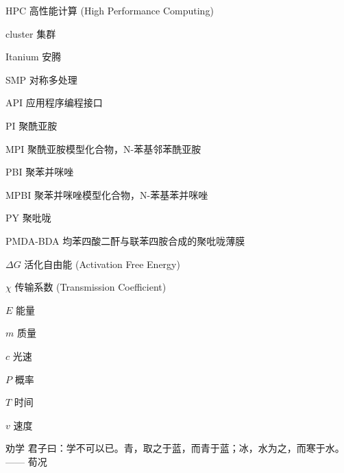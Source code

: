 \begin{denotation}[3cm]
\item[HPC] 高性能计算 (High Performance Computing)
\item[cluster] 集群
\item[Itanium] 安腾
\item[SMP] 对称多处理
\item[API] 应用程序编程接口
\item[PI] 聚酰亚胺
\item[MPI] 聚酰亚胺模型化合物，N-苯基邻苯酰亚胺
\item[PBI] 聚苯并咪唑
\item[MPBI] 聚苯并咪唑模型化合物，N-苯基苯并咪唑
\item[PY] 聚吡咙
\item[PMDA-BDA]	均苯四酸二酐与联苯四胺合成的聚吡咙薄膜
\item[$\Delta G$] 活化自由能 (Activation Free Energy)
\item[$\chi$] 传输系数 (Transmission Coefficient)
\item[$E$] 能量
\item[$m$] 质量
\item[$c$] 光速
\item[$P$] 概率
\item[$T$] 时间
\item[$v$] 速度
\item[劝学] 君子曰：学不可以已。青，取之于蓝，而青于蓝；冰，水为之，而寒于水。—— 荀况
\end{denotation}
